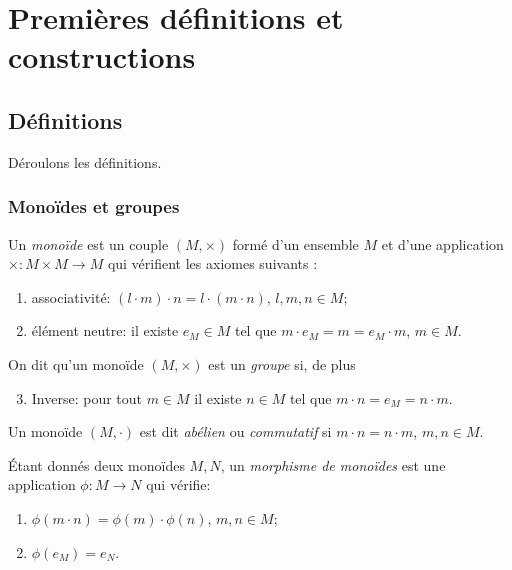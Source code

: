 \chapter{Premières définitions et constructions}

\section{Définitions}

Déroulons les définitions.

\subsection{Monoïdes et groupes}

\begin{definition}
    Un \emph{monoïde} est un couple $(M,\times)$ formé d'un
    ensemble $M$ et d'une application $\times:M\times M\rightarrow M$ qui
    vérifient les axiomes suivants :
    \begin{enumerate}
      \item associativité: $(l\cdot m)\cdot n=l\cdot (m\cdot n)$, $l,m,n\in M$;
      \item élément neutre: il existe $e_M\in M$ tel que $m\cdot e_M=m=e_M\cdot
          m$, $m\in M$.
    \end{enumerate}

    On dit qu'un monoïde $(M,\times)$ est un \emph{groupe} si, de
    plus
    \begin{enumerate}
    \setcounter{enumi}{2}
        \item Inverse: pour tout $m\in M$ il existe $n\in M$ tel  que $m\cdot
        n=e_M=n\cdot m$.
    \end{enumerate}
\end{definition}

Un monoïde $(M,\cdot)$ est dit \emph{abélien} ou \emph{commutatif} si $m\cdot
n=n\cdot m$, $m,n\in M$.

\begin{definition}
    Étant donnés deux monoïdes $M,N$, un \emph{morphisme de monoïdes} est une
    application $\phi:M\rightarrow N$ qui vérifie:
    \begin{enumerate}
        \item $\phi(m\cdot n)=\phi(m)\cdot\phi(n)$, $m,n\in M$;
        \item $\phi(e_M )=e_N$.
    \end{enumerate}
\end{definition}

